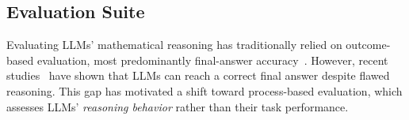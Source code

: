 \documentclass[11pt]{article}
\def \task{\textsc{TIM}\xspace}
\begin{document}

\subsection{Evaluation Suite}
\label{sec:evaluation_suite}
Evaluating LLMs' mathematical reasoning has traditionally relied on outcome-based evaluation, most predominantly final-answer accuracy~\citep{10.1145/3773985, ahn-etal-2024-large}. However, recent studies~\citep{mondorf2024accuracyevaluatingreasoningbehavior, yee2024faithful} have shown that LLMs can reach a correct final answer despite flawed reasoning.
This gap has motivated a shift toward process-based evaluation, which assesses LLMs' \textit{reasoning behavior} rather than their task performance.
\end{document}
